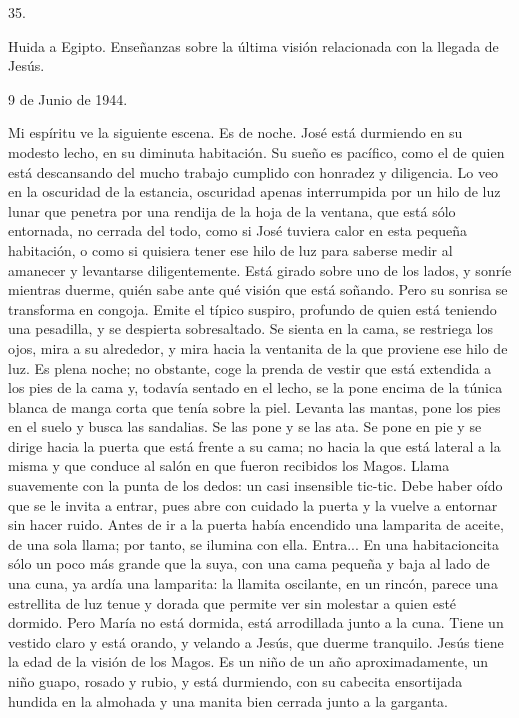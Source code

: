 \documentclass[12pt]{book} %
\begin{document}
 
 
35. 
 
Huida a Egipto. Enseñanzas sobre la última visión relacionada con la llegada de Jesús. 
 
 
9 de Junio de 1944. 
 
Mi espíritu ve la siguiente escena. 
Es de noche. José está durmiendo en su modesto lecho, en su diminuta habitación. Su sueño es pacífico, como el de 
quien está descansando del mucho trabajo cumplido con honradez y diligencia. 
Lo veo en la oscuridad de la estancia, oscuridad apenas interrumpida por un hilo de luz lunar que penetra por una 
rendija de la hoja de la ventana, que está sólo entornada, no cerrada del todo, como si José tuviera calor en esta pequeña habitación, o como si quisiera tener ese hilo de luz para saberse medir al amanecer y levantarse diligentemente. Está girado sobre uno de los lados, y sonríe mientras duerme, quién sabe ante qué visión que está soñando. 
Pero su sonrisa se transforma en congoja. Emite el típico suspiro, profundo de quien está teniendo una pesadilla, y se 
despierta sobresaltado. Se sienta en la cama, se restriega los ojos, mira a su alrededor, y mira hacia la ventanita de la que proviene ese hilo de luz. Es plena noche; no obstante, coge la prenda de vestir que está extendida a los pies de la cama y, todavía sentado en el lecho, se la pone encima de la túnica blanca de manga corta que tenía sobre la piel. Levanta las mantas, pone los pies en el suelo y busca las sandalias. Se las pone y se las ata. Se pone en pie y se dirige hacia la puerta que está frente a su cama; no hacia la que está lateral a la misma y que conduce al salón en que fueron recibidos los Magos. 
Llama suavemente con la punta de los dedos: un casi insensible tic-tic. Debe haber oído que se le invita a entrar, pues 
abre con cuidado la puerta y la vuelve a entornar sin hacer ruido. Antes de ir a la puerta había encendido una lamparita de aceite, de una sola llama; por tanto, se ilumina con ella. Entra... En una habitacioncita sólo un poco más grande que la suya, con una cama pequeña y baja al lado de una cuna, ya ardía una lamparita: la llamita oscilante, en un rincón, parece una estrellita de luz tenue y dorada que permite ver sin molestar a quien esté dormido. 
Pero María no está dormida, está arrodillada junto a la cuna. Tiene un vestido claro y está orando, y velando a Jesús, 
que duerme tranquilo. Jesús tiene la edad de la visión de los Magos. Es un niño de un año aproximadamente, un niño guapo, rosado y rubio, y está durmiendo, con su cabecita ensortijada hundida en la almohada y una manita bien cerrada junto a la garganta. 
\end{document}
